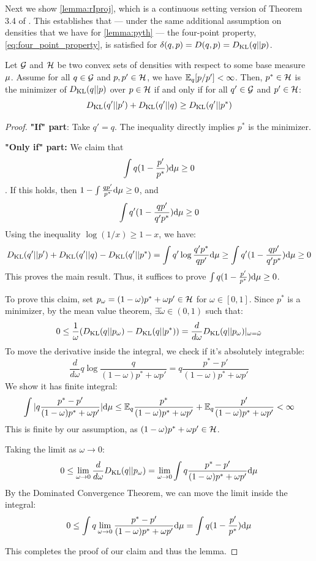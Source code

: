Next we show \cref{lemma:rIproj}, which is a continuous setting version of Theorem 3.4 of \citet{csiszar2004information}. This establishes that --- under the same additional assumption on densities that we have for \cref{lemma:pyth} --- the four-point property, \cref{eq:four_point_property}, is satisfied for $\delta(q,p)=D(q,p)=D_{\mathrm{KL}}(q||p)$.

\begin{myLemma}
\label{lemma:rIproj}
    Let $\mathcal{G}$ and $\mathcal{H}$ be two convex sets of densities with respect to some base measure $\mu$. Assume for all $q \in \mathcal{G}$ and $p, p' \in \mathcal{H}$, we have $\mathbb{E}_{q} [p/p'] < \infty$. Then, $p^* \in \mathcal{H}$ is the minimizer of $D_{\mathrm{KL}}(q||p)$ over $p \in \mathcal{H}$ if and only if for all $q' \in \mathcal{G}$ and $p' \in \mathcal{H}$:
$$D_{\mathrm{KL}}(q'||p') + D_{\mathrm{KL}}(q'||q) \ge D_{\mathrm{KL}}(q'||p^*)$$
\end{myLemma}
\begin{proof}

\textbf{"If" part}: Take $q'=q$. The inequality directly implies $p^*$ is the minimizer.

\textbf{"Only if" part:} We claim that 
$$\int q(1-\frac{p'}{p^*})\mathrm{d}\mu \ge 0$$. 
If this holds, then $1-\int \frac{qp'}{p^*}\mathrm{d}\mu \ge 0$, and 
$$\int q'(1-\frac{qp'}{q'p^*})\mathrm{d}\mu \ge 0$$
Using the inequality $\log(1/x) \ge 1-x$, we have:
$$D_{\mathrm{KL}}(q'||p') + D_{\mathrm{KL}}(q'||q) - D_{\mathrm{KL}}(q'||p^*) = \int q'\log\frac{q'p^*}{qp'}\mathrm{d}\mu \ge \int q'(1-\frac{qp'}{q'p^*})\mathrm{d}\mu \ge 0$$
This proves the main result. Thus, it suffices to prove $\int q(1-\frac{p'}{p^*})\mathrm{d}\mu \ge 0$.

To prove this claim, set $p_{\omega} = (1-\omega)p^* + \omega p' \in \mathcal{H}$ for $\omega \in [0,1]$. Since $p^*$ is a minimizer, by the mean value theorem, $\exists \tilde\omega \in (0,1)$ such that:
$$0 \le \frac{1}{\omega}(D_{\mathrm{KL}}(q||p_\omega) - D_{\mathrm{KL}}(q||p^*)) = \frac{d}{d\omega} D_{\mathrm{KL}}(q||p_\omega) |_{\omega = \tilde\omega}$$
To move the derivative inside the integral, we check if it's absolutely integrable:
$$\frac{d}{d\omega} q\log\frac{q}{(1-\omega)p^* + \omega p'} = q\frac{p^*-p'}{(1-\omega)p^* + \omega p'}$$
We show it has finite integral:
$$\int |q\frac{p^*-p'}{(1-\omega)p^* + \omega p'}|\mathrm{d}\mu \le \mathbb{E}_{q} \frac{p^*}{(1-\omega)p^* + \omega p'} + \mathbb{E}_{q} \frac{p'}{(1-\omega)p^* + \omega p'} < \infty$$
This is finite by our assumption, as $(1-\omega)p^* + \omega p' \in \mathcal{H}$.

Taking the limit as $\omega \to 0$:
$$0 \le \lim_{\omega\to 0} \frac{d}{d\omega} D_{\mathrm{KL}}(q||p_\omega) = \lim_{\omega\to 0} \int q\frac{p^*-p'}{(1-\omega)p^* + \omega p'}\mathrm{d}\mu$$
By the Dominated Convergence Theorem, we can move the limit inside the integral:
$$0 \le \int q\lim_{\omega\to 0} \frac{p^*-p'}{(1-\omega)p^* + \omega p'} \mathrm{d}\mu= \int q(1-\frac{p'}{p^*})\mathrm{d}\mu$$

This completes the proof of our claim and thus the lemma.
\end{proof}

